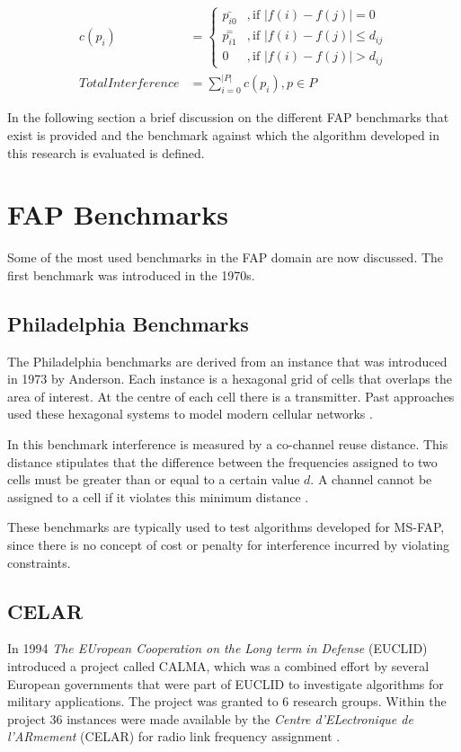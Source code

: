 \begin{align} 
 \label{E:interferenceCases}
 c(p_i) &= 
 \begin{cases}
	\bar{p_{i0}} &,\text{if $|f(i) - f(j)| = 0$}\\
	\overset{=}{p_{i1}} &, \text{if $|f(i) - f(j)| \leqslant d_{ij}$}\\
	0 &,\text{if $|f(i) - f(j)| > d_{ij}$}
 \end{cases}\\
 \label{E:costFunction}
 Total Interference &= \sum^{|P|}_{i = 0}c(p_i),p \in P 
\end{align}

In the following section a brief discussion on the different FAP benchmarks that exist is provided and the benchmark against which the algorithm developed in this research is evaluated is defined.
\section{FAP Benchmarks}
\label{sec:FAPBenchmarks}
Some of the most used benchmarks in the FAP domain are now discussed. The first benchmark was introduced in the 1970s.
\subsection{Philadelphia Benchmarks}
The Philadelphia benchmarks are derived from an instance that was introduced in 1973 by Anderson\cite{AndersonPhiladelphia}. Each instance is a hexagonal grid of cells that overlaps the area of interest. At the centre of each cell there is a transmitter. Past approaches used these hexagonal systems to model modern cellular networks \cite{Karen2004,ExactMIFAP}.

In this benchmark interference is measured by a co-channel reuse distance\cite{Karen2004}. This distance stipulates that the difference between the frequencies  assigned to two cells must be greater than or equal to a certain value $d$. A channel cannot be assigned to a cell if it violates this minimum distance \cite{ExactMIFAP}.

These benchmarks are typically used to test algorithms developed for MS-FAP, since there is no concept of cost or penalty for interference incurred by violating constraints.
\subsection{CELAR}
In 1994 \emph{The EUropean Cooperation on the Long term in Defense} (EUCLID) introduced a project called CALMA, which was a combined effort by several European governments that were part of EUCLID to investigate algorithms for military applications\cite{Karen2004}. The project was granted to 6 research groups. Within the project 36 instances were made available by the \emph{Centre d'ELectronique de l'ARmement} (CELAR) for radio link frequency assignment \cite{Karen2004,DynamicFAP}.

